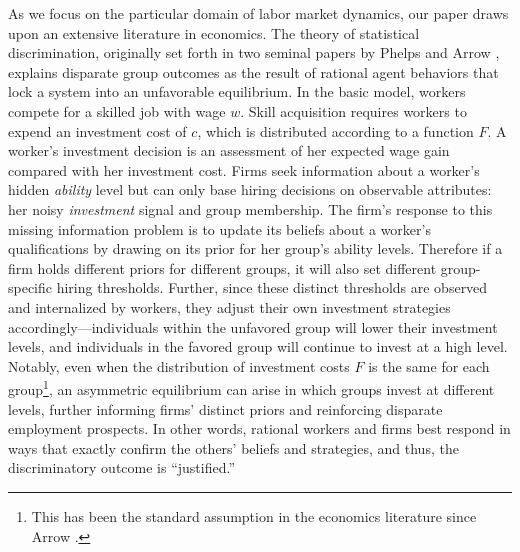 \documentclass[sigconf]{acmart}
\theoremstyle{definition}
\begin{document}


As we focus on the particular domain of labor market dynamics, our paper draws upon an extensive literature in economics. The theory of statistical discrimination, originally set forth in two seminal papers by Phelps \cite{phelps1972statistical} and Arrow \cite{arrow1973theory}, explains disparate group outcomes as the result of rational agent behaviors that lock a system into an unfavorable equilibrium. In the basic model, workers compete for a skilled job with wage $w$. Skill acquisition requires workers to expend an investment cost of $c$, which is distributed according to a function $F$. A worker's investment decision is an assessment of her expected wage gain compared with her investment cost. Firms seek information about a worker's hidden \textit{ability} level but can only base hiring decisions on observable attributes: her noisy \textit{investment} signal and group membership. The firm's response to this missing information problem is to update its beliefs about a worker's qualifications by drawing on its prior for her group's ability levels. Therefore if a firm holds different priors for different groups, it will also set different group-specific hiring thresholds. Further, since these distinct thresholds are observed and internalized by workers, they adjust their own investment strategies accordingly---individuals within the unfavored group will lower their investment levels, and individuals in the favored group will continue to invest at a high level. Notably, even when the distribution of investment costs $F$ is the same for each group\footnote{This has been the standard assumption in the economics literature since Arrow \cite{arrow1973theory}.}, an asymmetric equilibrium can arise in which groups invest at different levels, further informing firms' distinct priors and reinforcing disparate employment prospects. In other words, rational workers and firms best respond in ways that exactly confirm the others' beliefs and strategies, and thus, the discriminatory outcome is ``justified.''
\end{document}
